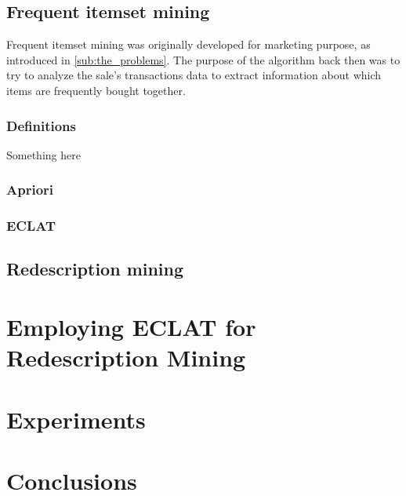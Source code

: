 \section{Frequent itemset mining}
Frequent itemset mining was originally developed for marketing purpose, as introduced in \autoref{sub:the_problems}.
The purpose of the algorithm back then was to try to analyze the sale's transactions data to extract information about which items are frequently bought together.
\subsection{Definitions}

\begin{definition}[Test]
    Something here
\end{definition}
\subsection{Apriori}
\subsection{ECLAT}

\section{Redescription mining}


\chapter{Employing ECLAT for Redescription Mining}
\label{cha:employment}

\chapter{Experiments}
\label{cha:experiments}

\chapter{Conclusions}
\label{cha:conclusions}